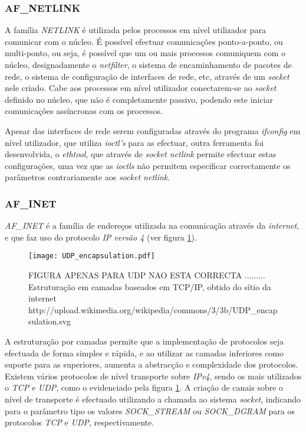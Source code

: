 \subsubsection{AF\_NETLINK}

A família \textit{NETLINK} é utilizada pelos processos em nível utilizador para comunicar com o núcleo.
É possível efectuar comunicações ponto-a-ponto, ou multi-ponto, ou seja, é possível que um ou mais processos comuniquem com o núcleo, designadamente o \textit{netfilter}, o sistema de encaminhamento de pacotes de rede, o sistema de configuração de interfaces de rede, etc, através de um \textit{socket} nele criado.
Cabe aos processos em nível utilizador conectarem-se ao \textit{socket} definido no núcleo, que não é completamente passivo, podendo este iniciar comunicações assíncronas com os processos.

Apesar das interfaces de rede serem configuradas através do programa \textit{ifconfig} em nível utilizador, que utiliza \textit{ioctl's} para as efectuar, outra ferramenta foi desenvolvida, o \textit{ethtool}, que através de \textit{socket netlink} permite efectuar estas configurações, uma vez que as \textit{ioctls} não permitem especificar correctamente os parâmetros contrariamente aos \textit{socket netlink}.

\subsubsection{AF\_INET}
\label{subsub:af_inet}

\textit{AF\_INET} é a família de endereços utilizada na comunicação através da \textit{internet}, e que faz uso do protocolo \textit{IP versão 4} (ver figura \ref{fig:stack_tcp_ip}).

\begin{figure}[ht]
\centering
\texttt{[image: UDP\_encapsulation.pdf]}
\caption{FIGURA APENAS PARA UDP NAO ESTA CORRECTA ......... Estruturação em camadas baseados em TCP/IP, obtido do sítio da internet http://upload.wikimedia.org/wikipedia/commons/3/3b/UDP\_encapsulation.svg}
\label{fig:stack_tcp_ip}
\end{figure}


A estruturação por camadas permite que a implementação de protocolos seja efectuada de forma simples e rápida, e ao utilizar as camadas inferiores como suporte para as superiores, aumenta a abstracção e complexidade dos protocolos.
Existem vários protocolos de nível transporte sobre \textit{IPv4}, sendo os mais utilizados o \textit{TCP} e \textit{UDP}, como o evidenciado pela figura \ref{fig:stack_tcp_ip}.
A criação de canais sobre o nível de transporte é efectuado utilizando a chamada ao sistema \textit{socket}, indicando para o parâmetro tipo os valores \textit{SOCK\_STREAM} ou \textit{SOCK\_DGRAM} para os protocolos \textit{TCP} e \textit{UDP}, respectivamente.

